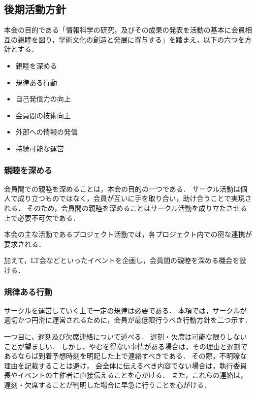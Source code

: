 \subsection*{後期活動方針}


本会の目的である「情報科学の研究，及びその成果の発表を活動の基本に会員相互の親睦を図り，学術文化の創造と発展に寄与する」を踏まえ，以下の六つを方針とする．

\begin{itemize}
  \item 親睦を深める
  \item 規律ある行動
  \item 自己発信力の向上
  \item 会員間の技術向上
  \item 外部への情報の発信
  \item 持続可能な運営
\end{itemize}

\subsubsection*{親睦を深める}
会員間での親睦を深めることは，本会の目的の一つである．
サークル活動は個人で成り立つものではなく，会員が互いに手を取り合い，助け合うことで実現される．
そのため，会員間の親睦を深めることはサークル活動を成り立たさせる上で必要不可欠である．

本会の主な活動であるプロジェクト活動では，各プロジェクト内での密な連携が要求される．

加えて，LT会などといったイベントを企画し，会員間の親睦を深める機会を設ける．

\subsubsection*{規律ある行動}
サークルを運営していく上で一定の規律は必要である．
本項では，サークルが適切かつ円滑に運営されるために，会員が最低限行うべき行動方針を二つ示す．

一つ目に，遅刻及び欠席連絡について述べる．
遅刻・欠席は可能な限りしないことが望ましい．
しかし，やむを得ない事情がある場合は，その理由と遅刻であるならば到着予想時刻を明記した上で連絡すべきである．
その際，不明瞭な理由を記載することは避け，
会全体に伝えるべき内容でない場合は，執行委員長やイベントの主催者に直接伝えることを心がける．
また，これらの連絡は，遅刻・欠席することが判明した場合に早急に行うことを心がける．

